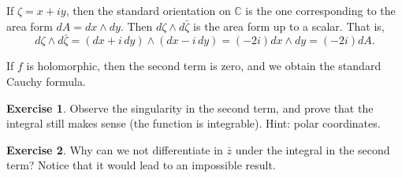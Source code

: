 \documentclass[12pt,openany]{book}
\newcommand{\C}{{\mathbb{C}}}
\newcommand{\R}{{\mathbb{R}}}
\theoremstyle{plain}
\theoremstyle{remark}
\theoremstyle{definition}
\newenvironment{exbox}{%
    \def\FrameCommand{\vrule width 1pt \relax\hspace {10pt}}%
    \MakeFramed {\advance \hsize -\width \FrameRestore }%
}{%
    \endMakeFramed
}
\theoremstyle{exercise}
\newtheorem{exercise}{Exercise}[section]
\theoremstyle{example}
\begin{document}
%
If $\zeta = x+iy$, then the standard orientation on $\C$ is the one
corresponding to the area form $dA = dx \wedge dy$.
Then $d\zeta \wedge d\bar{\zeta}$ is the area form up to a scalar.
That is,
\begin{equation*}
d\zeta \wedge d\bar{\zeta}
=
(dx+i\,dy)\wedge (dx-i\,dy)
=
(- 2 i ) dx \wedge dy = (-2i) dA .
\end{equation*}

If $f$ is holomorphic, then the second term is zero, and we
obtain the standard Cauchy formula.

\begin{exbox}
\begin{exercise}
Observe the singularity in the second term, and prove that the integral still makes
sense (the function is integrable).  Hint: polar coordinates.
\end{exercise}

\begin{exercise}
Why can we not differentiate in $\bar{z}$ under the integral in the second
term?  Notice that it would lead to an impossible result.
\end{exercise}
\end{exbox}
\end{document}
